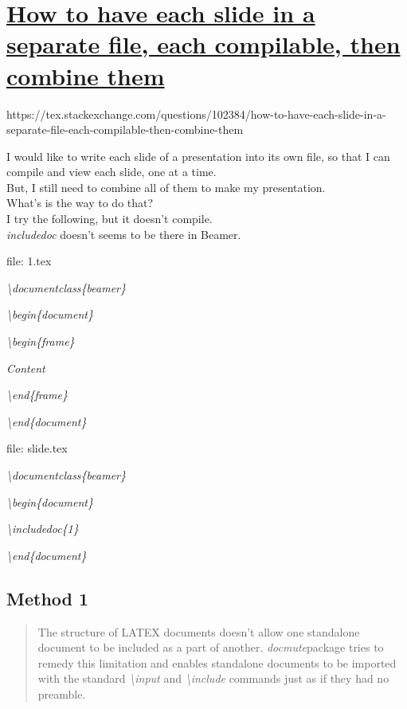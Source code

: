\section{\texorpdfstring{\href{https://tex.stackexchange.com/questions/102384/how-to-have-each-slide-in-a-separate-file-each-compilable-then-combine-them}{How
to have each slide in a separate file, each compilable, then combine
them}}{How to have each slide in a separate file, each compilable, then combine them}}\label{how-to-have-each-slide-in-a-separate-file-each-compilable-then-combine-them}

https://tex.stackexchange.com/questions/102384/how-to-have-each-slide-in-a-separate-file-each-compilable-then-combine-them

I would like to write each slide of a presentation into its own file, so
that I can compile and view each slide, one at a time.\\
But, I still need to combine all of them to make my presentation.\\
What's is the way to do that?\\
I try the following, but it doesn't compile.\\
\emph{includedoc} doesn't seems to be there in Beamer.

file: 1.tex

\emph{\textbackslash{}documentclass\{beamer\}}

\emph{\textbackslash{}begin\{document\}}

\emph{ \textbackslash{}begin\{frame\}}

\emph{ Content}

\emph{ \textbackslash{}end\{frame\}}

\emph{\textbackslash{}end\{document\}}

file: slide.tex

\emph{\textbackslash{}documentclass\{beamer\}}

\emph{\textbackslash{}begin\{document\}}

\emph{ \textbackslash{}includedoc\{1\}}

\emph{\textbackslash{}end\{document\}}

\subsection{Method 1}\label{method-1}

\begin{quote}
The structure of LATEX documents doesn't allow one standalone document
to be included as a part of another. \emph{docmute}package tries to
remedy this limitation and enables standalone documents to be imported
with the standard \emph{\textbackslash{}input} and
\emph{\textbackslash{}include} commands just as if they had no preamble.
\end{quote}

